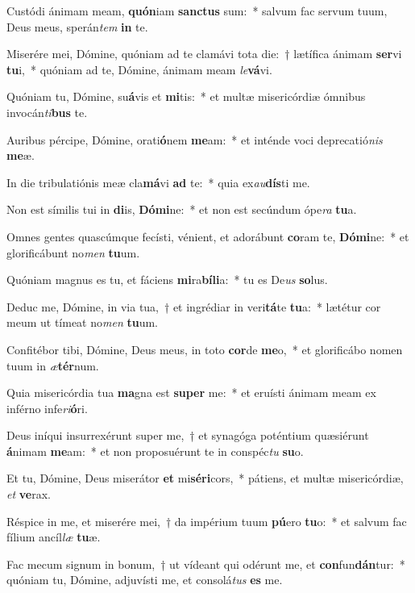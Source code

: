 \item Custódi ánimam meam, \textbf{quón}iam \textbf{sanc}\textbf{tus} sum:~* salvum fac servum tuum, Deus meus, sperán\textit{tem} \textbf{in} te.
\item Miserére mei, Dómine, quóniam ad te clamávi tota die:~† lætífica ánimam \textbf{ser}vi \textbf{tu}i,~* quóniam ad te, Dómine, ánimam meam \textit{le}\textbf{vá}vi.
\item Quóniam tu, Dómine, su\textbf{á}vis et \textbf{mi}tis:~* et multæ misericórdiæ ómnibus invocán\textit{ti}\textbf{bus} te.
\item Auribus pércipe, Dómine, orati\textbf{ó}nem \textbf{me}am:~* et inténde voci deprecatió\textit{nis} \textbf{me}æ.
\item In die tribulatiónis meæ cla\textbf{má}vi \textbf{ad} te:~* quia ex\textit{au}\textbf{dís}ti me.
\item Non est símilis tui in \textbf{di}is, \textbf{Dó}\textbf{mi}ne:~* et non est secúndum ópe\textit{ra} \textbf{tu}a.
\item Omnes gentes quascúmque fecísti, vénient, et adorábunt \textbf{co}ram te, \textbf{Dó}\textbf{mi}ne:~* et glorificábunt no\textit{men} \textbf{tu}um.
\item Quóniam magnus es tu, et fáciens \textbf{mi}ra\textbf{bí}\textbf{li}a:~* tu es De\textit{us} \textbf{so}lus.
\item Deduc me, Dómine, in via tua,~† et ingrédiar in veri\textbf{tá}te \textbf{tu}a:~* lætétur cor meum ut tímeat no\textit{men} \textbf{tu}um.
\item Confitébor tibi, Dómine, Deus meus, in toto \textbf{cor}de \textbf{me}o,~* et glorificábo nomen tuum in \textit{æ}\textbf{tér}num.
\item Quia misericórdia tua \textbf{ma}gna est \textbf{su}\textbf{per} me:~* et eruísti ánimam meam ex inférno infe\textit{ri}\textbf{ó}ri.
\item Deus iníqui insurrexérunt super me,~† et synagóga poténtium quæsiérunt \textbf{á}nimam \textbf{me}am:~* et non proposuérunt te in conspéc\textit{tu} \textbf{su}o.
\item Et tu, Dómine, Deus miserátor \textbf{et} mi\textbf{sé}\textbf{ri}cors,~* pátiens, et multæ misericórdiæ, \textit{et} \textbf{ve}rax.
\item Réspice in me, et miserére mei,~† da impérium tuum \textbf{pú}ero \textbf{tu}o:~* et salvum fac fílium ancíl\textit{læ} \textbf{tu}æ.
\item Fac mecum signum in bonum,~† ut vídeant qui odérunt me, et \textbf{con}fun\textbf{dán}tur:~* quóniam tu, Dómine, adjuvísti me, et consolá\textit{tus} \textbf{es} me.
